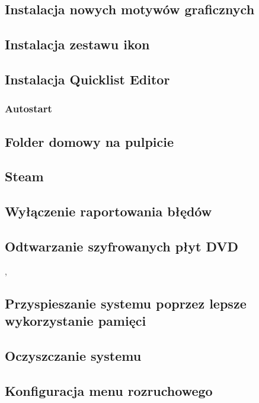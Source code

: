 \documentclass[a4paper,11pt,oneside]{mwart}
\begin{document}
		\subsection{Instalacja nowych motywów graficznych}
			
		\subsection{Instalacja zestawu ikon}
			
		\subsection{Instalacja Quicklist Editor}
			
		\subsubsection{Autostart}
			
		\subsection{Folder domowy na pulpicie}
			
		\subsection{Steam}
			
		\subsection{Wyłączenie raportowania błędów}
			
		\subsection{Odtwarzanie szyfrowanych płyt DVD}
,			
		\subsection{Przyspieszanie systemu poprzez lepsze wykorzystanie pamięci}
			
		\subsection{Oczyszczanie systemu}
			
		\subsection{Konfiguracja menu rozruchowego}
			
\end{document}
